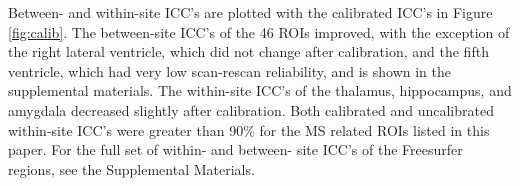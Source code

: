 Between- and within-site ICC's are plotted with the calibrated ICC's in Figure \ref{fig:calib}. The between-site ICC's of the 46 ROIs improved, with the exception of the right lateral ventricle, which did not change after calibration, and the fifth ventricle, which  had very low scan-rescan reliability, and is shown in the supplemental materials. The within-site ICC's of the thalamus, hippocampus, and amygdala decreased slightly after calibration. Both calibrated and uncalibrated within-site ICC's were greater than 90\% for the MS related ROIs listed in this paper. For the full set of within- and between- site ICC's of the Freesurfer regions, see the Supplemental Materials.